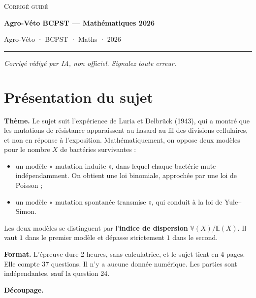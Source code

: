 \documentclass[11pt,a4paper]{article}
\providecommand{\tightlist}{\setlength{\itemsep}{0pt}\setlength{\parskip}{0pt}}
\begin{document}
\thispagestyle{plain}
\begin{center}
  {\small\scshape Corrigé guidé}\par\smallskip
  {\LARGE\bfseries Agro-Véto BCPST — Mathématiques 2026\par}\medskip
  {\large Agro-Véto · BCPST · Maths · 2026\par}
\end{center}
\vspace{2pt}\hrule\vspace{8pt}

\emph{Corrigé rédigé par IA, non officiel. Signalez toute erreur.}

\hypertarget{pruxe9sentation-du-sujet}{%
\section{Présentation du sujet}\label{pruxe9sentation-du-sujet}}

\textbf{Thème.} Le sujet suit l'expérience de Luria et Delbrück (1943), qui a montré que les mutations de résistance apparaissent au hasard au fil des divisions cellulaires, et non en réponse à l'exposition. Mathématiquement, on oppose deux modèles pour le nombre \(X\) de bactéries survivantes :

\begin{itemize}
\tightlist
\item
  un modèle « mutation induite », dans lequel chaque bactérie mute indépendamment. On obtient une loi binomiale, approchée par une loi de Poisson ;
\item
  un modèle « mutation spontanée transmise », qui conduit à la loi de Yule--Simon.
\end{itemize}

Les deux modèles se distinguent par l'\textbf{indice de dispersion} \(\mathbb V(X)/\mathbb E(X)\). Il vaut \(1\) dans le premier modèle et dépasse strictement \(1\) dans le second.

\textbf{Format.} L'épreuve dure 2 heures, sans calculatrice, et le sujet tient en 4 pages. Elle compte 37 questions. Il n'y a aucune donnée numérique. Les parties sont indépendantes, sauf la question 24.

\textbf{Découpage.}
\end{document}
